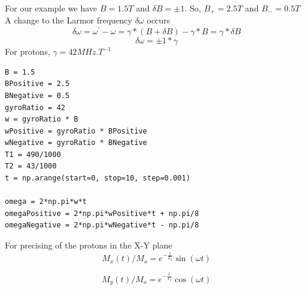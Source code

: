 \documentclass[18pt]{extarticle}
\begin{document}
For our example we have $B = 1.5 T$ and $\delta B = \pm 1$. So, $B_+ = 2.5 T$ and $B_- = 0.5 T$
A change to the Larmor frequency $\delta \omega$ occurs
\begin{equation*}
\delta \omega = \omega ^{'} - \omega = \gamma * (B + \delta B) - \gamma * B = \gamma * \delta B
\end{equation*}
\begin{equation*}
\delta \omega = \pm 1 * \gamma
\end{equation*}
For protons, $\gamma = 42 MHz.T^{-1}$
\newline
\begin{lstlisting}
B = 1.5
BPositive = 2.5
BNegative = 0.5
gyroRatio = 42
w = gyroRatio * B
wPositive = gyroRatio * BPositive
wNegative = gyroRatio * BNegative
T1 = 490/1000
T2 = 43/1000
t = np.arange(start=0, stop=10, step=0.001)

omega = 2*np.pi*w*t
omegaPositive = 2*np.pi*wPositive*t + np.pi/8
omegaNegative = 2*np.pi*wNegative*t - np.pi/8
\end{lstlisting}


For precising of the protons in the X-Y plane
\begin{equation*}
M_x(t) / M_o = e^{-\frac{t}{T_2}} \sin (\omega t)
\end{equation*}

\begin{equation*}
M_y(t) / M_o = e^{-\frac{t}{T_2}} \cos (\omega t)
\end{equation*}
\end{document}
